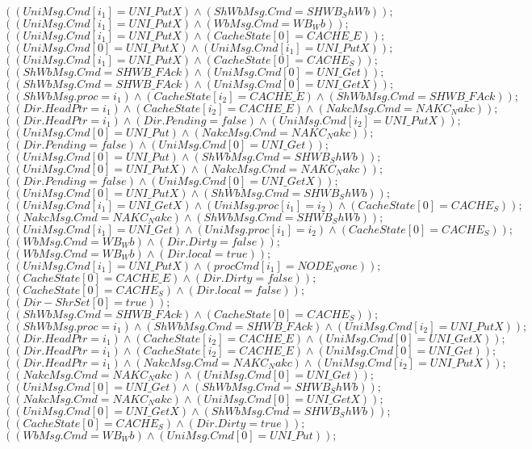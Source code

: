 \documentclass{llncs}
\begin{document}
\begin{itemize}
$( ( UniMsg.Cmd[i_1]=UNI\_PutX)  \wedge ( ShWbMsg.Cmd=SHWB_ShWb)  ) ;$
$( ( UniMsg.Cmd[i_1]=UNI\_PutX)  \wedge ( WbMsg.Cmd=WB_Wb)  ) ;$
$( ( UniMsg.Cmd[i_1]=UNI\_PutX)  \wedge ( CacheState[0]=CACHE\_E)  ) ;$
$( ( UniMsg.Cmd[0]=UNI\_PutX)  \wedge ( UniMsg.Cmd[i_1]=UNI\_PutX)  ) ;$
$( ( UniMsg.Cmd[i_1]=UNI\_PutX)  \wedge ( CacheState[0]=CACHE_S)  ) ;$
$( ( ShWbMsg.Cmd=SHWB\_FAck)  \wedge ( UniMsg.Cmd[0]=UNI\_Get)  ) ;$
$( ( ShWbMsg.Cmd=SHWB\_FAck)  \wedge ( UniMsg.Cmd[0]=UNI\_GetX)  ) ;$
$( ( ShWbMsg.proc=i_1)  \wedge ( CacheState[i_2]=CACHE\_E)  \wedge ( ShWbMsg.Cmd=SHWB\_FAck)  ) ;$
$( ( Dir.HeadPtr=i_1)  \wedge ( CacheState[i_2]=CACHE\_E)  \wedge ( NakcMsg.Cmd=NAKC_Nakc)  ) ;$
$( ( Dir.HeadPtr=i_1)  \wedge ( Dir.Pending=false)  \wedge ( UniMsg.Cmd[i_2]=UNI\_PutX)  ) ;$
$( ( UniMsg.Cmd[0]=UNI\_Put)  \wedge ( NakcMsg.Cmd=NAKC_Nakc)  ) ;$
$( ( Dir.Pending=false)  \wedge ( UniMsg.Cmd[0]=UNI\_Get)  ) ;$
$( ( UniMsg.Cmd[0]=UNI\_Put)  \wedge ( ShWbMsg.Cmd=SHWB_ShWb)  ) ;$
$( ( UniMsg.Cmd[0]=UNI\_PutX)  \wedge ( NakcMsg.Cmd=NAKC_Nakc)  ) ;$
$( ( Dir.Pending=false)  \wedge ( UniMsg.Cmd[0]=UNI\_GetX)  ) ;$
$( ( UniMsg.Cmd[0]=UNI\_PutX)  \wedge ( ShWbMsg.Cmd=SHWB_ShWb)  ) ;$
$( ( UniMsg.Cmd[i_1]=UNI\_GetX)  \wedge ( UniMsg.proc[i_1]=i_2)  \wedge ( CacheState[0]=CACHE_S)  ) ;$
$( ( NakcMsg.Cmd=NAKC_Nakc)  \wedge ( ShWbMsg.Cmd=SHWB_ShWb)  ) ;$
$( ( UniMsg.Cmd[i_1]=UNI\_Get)  \wedge ( UniMsg.proc[i_1]=i_2)  \wedge ( CacheState[0]=CACHE_S)  ) ;$
$( ( WbMsg.Cmd=WB_Wb)  \wedge ( Dir.Dirty=false)  ) ;$
$( ( WbMsg.Cmd=WB_Wb)  \wedge ( Dir.local=true)  ) ;$
$( ( UniMsg.Cmd[i_1]=UNI\_PutX)  \wedge ( procCmd[i_1]=NODE_None)  ) ;$
$( ( CacheState[0]=CACHE\_E)  \wedge ( Dir.Dirty=false)  ) ;$
$( ( CacheState[0]=CACHE_S)  \wedge ( Dir.local=false)  ) ;$
$( ( Dir-ShrSet[0]=true)  ) ;$
$( ( ShWbMsg.Cmd=SHWB\_FAck)  \wedge ( CacheState[0]=CACHE_S)  ) ;$
$( ( ShWbMsg.proc=i_1)  \wedge ( ShWbMsg.Cmd=SHWB\_FAck)  \wedge ( UniMsg.Cmd[i_2]=UNI\_PutX)  ) ;$
$( ( Dir.HeadPtr=i_1)  \wedge ( CacheState[i_2]=CACHE\_E)  \wedge ( UniMsg.Cmd[0]=UNI\_GetX)  ) ;$
$( ( Dir.HeadPtr=i_1)  \wedge ( CacheState[i_2]=CACHE\_E)  \wedge ( UniMsg.Cmd[0]=UNI\_Get)  ) ;$
$( ( Dir.HeadPtr=i_1)  \wedge ( NakcMsg.Cmd=NAKC_Nakc)  \wedge ( UniMsg.Cmd[i_2]=UNI\_PutX)  ) ;$
$( ( NakcMsg.Cmd=NAKC_Nakc)  \wedge ( UniMsg.Cmd[0]=UNI\_Get)  ) ;$
$( ( UniMsg.Cmd[0]=UNI\_Get)  \wedge ( ShWbMsg.Cmd=SHWB_ShWb)  ) ;$
$( ( NakcMsg.Cmd=NAKC_Nakc)  \wedge ( UniMsg.Cmd[0]=UNI\_GetX)  ) ;$
$( ( UniMsg.Cmd[0]=UNI\_GetX)  \wedge ( ShWbMsg.Cmd=SHWB_ShWb)  ) ;$
$( ( CacheState[0]=CACHE_S)  \wedge ( Dir.Dirty=true)  ) ;$
$( ( WbMsg.Cmd=WB_Wb)  \wedge ( UniMsg.Cmd[0]=UNI\_Put)  ) ;$

\end{itemize}
\end{document}
